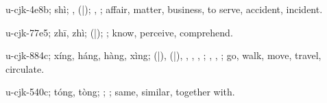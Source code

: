 \begin{multicols}{2}
{\cjkgGlue{}u-cjk-4e8b; shì; \cjkgGlue{}, \cjkgGlue{}\cjkgGlue{}(\cjkgGlue{}|\cjkgGlue{}); \cjkgGlue{}, \cjkgGlue{}; affair, matter, business, to serve, accident, incident.

\cjkgGlue{}u-cjk-77e5; zhī, zhì; \cjkgGlue{}\cjkgGlue{}(\cjkgGlue{}|\cjkgGlue{}); \cjkgGlue{}; know, perceive, comprehend.

\cjkgGlue{}u-cjk-884c; xíng, háng, hàng, xìng; \cjkgGlue{}\cjkgGlue{}(\cjkgGlue{}|\cjkgGlue{}), \cjkgGlue{}\cjkgGlue{}(\cjkgGlue{}|\cjkgGlue{}), \cjkgGlue{}, \cjkgGlue{}, \cjkgGlue{}\cjkgGlue{}\cjkgGlue{}, \cjkgGlue{}\cjkgGlue{}\cjkgGlue{}; \cjkgGlue{}, \cjkgGlue{}, \cjkgGlue{}; go, walk, move, travel, circulate.

\cjkgGlue{}u-cjk-540c; tóng, tòng; \cjkgGlue{}\cjkgGlue{}\cjkgGlue{}; \cjkgGlue{}; same, similar, together with.

}
\end{multicols}
